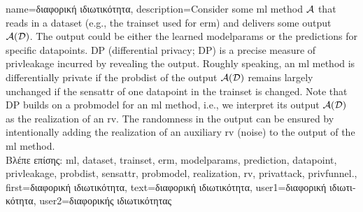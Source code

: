 {name={\foreignlanguage{greek}{διαφορική ιδιωτικότητα}},
 	description={Consider 
		some \gls{ml} method $\mathcal{A}$ that reads in a \gls{dataset} (e.g., the \gls{trainset} 
  		used for \gls{erm}) and delivers some output $\mathcal{A}(\mathcal{D})$. The output 
  		could be either the learned \gls{modelparams} or the \gls{prediction}s for specific \gls{datapoint}s. 
  		DP (differential privacy; DP) is a precise measure of \gls{privleakage} incurred by revealing the 
  		output. Roughly speaking, an \gls{ml} method is differentially private if the \gls{probdist} 
  		of the output $\mathcal{A}(\mathcal{D})$ remains largely unchanged if the \gls{sensattr} 
  		of one \gls{datapoint} in the \gls{trainset} is changed. Note that DP 
  		builds on a \gls{probmodel} for an \gls{ml} method, i.e., we interpret its output $\mathcal{A}(\mathcal{D})$ 
  		as the \gls{realization} of an \gls{rv}. The randomness in the output can be ensured 
  		by intentionally adding the \gls{realization} of an auxiliary \gls{rv} (noise) to 
  		the output of the \gls{ml} method.\\
		\foreignlanguage{greek}{Βλέπε επίσης:} \gls{ml}, \gls{dataset}, \gls{trainset}, \gls{erm}, \gls{modelparams}, \gls{prediction}, 
		\gls{datapoint}, \gls{privleakage}, \gls{probdist}, \gls{sensattr}, \gls{probmodel}, \gls{realization}, \gls{rv}, \gls{privattack}, \gls{privfunnel}.}, 
	first={\foreignlanguage{greek}{διαφορική ιδιωτικότητα}},
	text={\foreignlanguage{greek}{διαφορική ιδιωτικότητα}},
	user1={\foreignlanguage{greek}{διαφορική ιδιωτικότητα}}, %
   	user2={\foreignlanguage{greek}{διαφορικής ιδιωτικότητας}} %
}


